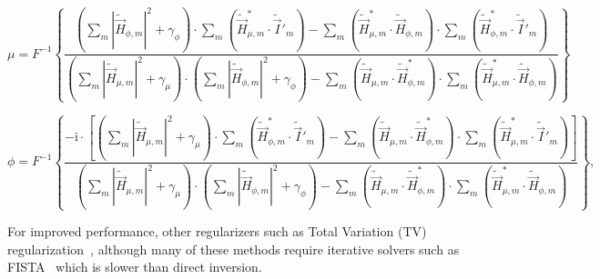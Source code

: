 \begin{equation} \label{eq:Ha_inverse}
\mu = F^{-1}\left\{\frac{\left(\sum\limits_{m}|\tilde{\vec{H}}_{\phi,m}|^2+\gamma_{\phi}\right)\cdot\sum\limits_{m}\left(\tilde{\vec{H}}^*_{\mu,m}\cdot\tilde{\vec{I}}'_{m}\right)-\sum\limits_{m} \left ( \tilde{\vec{H}}^*_{\mu,m}\cdot\tilde{\vec{H}}_{\phi,m} \right ) \cdot\sum\limits_{m}\left(\tilde{\vec{H}}^*_{\phi,m}\cdot\tilde{\vec{I}}'_{m}\right)}{\left(\sum\limits_{m}|\tilde{\vec{H}}_{\mu,m}|^2+\gamma_{\mu}\right)\cdot\left(\sum\limits_{m}|\tilde{\vec{H}}_{\phi,m}|^2+\gamma_{\phi}\right) - \sum\limits_{m}\left(\tilde{\vec{H}}_{\mu,m}\cdot\tilde{\vec{H}}^*_{\phi,m}\right)\cdot\sum\limits_{m}\left(\tilde{\vec{H}}^*_{\mu,m}\cdot\tilde{\vec{H}}_{\phi,m}\right)} \right\}
\end{equation}

\begin{equation} \label{eq:Hp_inverse}
\phi = F^{-1}\left\{\frac{-\mathrm{i}\cdot\left[\left(\sum\limits_{m}|\tilde{\vec{H}}_{\mu,m}|^2+\gamma_{\mu}\right)\cdot\sum\limits_{m}\left(\tilde{\vec{H}}^*_{\phi,m}\cdot\tilde{\vec{I}}'_{m}\right)-\sum\limits_{m}\left(\tilde{\vec{H}}_{\mu,m}\cdot\tilde{\vec{H}}^*_{\phi,m}\right)\cdot\sum\limits_{m}\left(\tilde{\vec{H}}^*_{\mu,m}\cdot\tilde{\vec{I}}'_{m}\right)\right]}{\left(\sum\limits_{m}|\tilde{\vec{H}}_{\mu,m}|^2+\gamma_{\mu}\right)\cdot\left(\sum\limits_{m}|\tilde{\vec{H}}_{\phi,m}|^2+\gamma_{\phi}\right)-\sum\limits_{m}\left(\tilde{\vec{H}}_{\mu,m}\cdot\tilde{\vec{H}}^*_{\phi,m}\right)\cdot\sum\limits_{m} \left( \tilde{\vec{H}}^*_{\mu,m}\cdot\tilde{\vec{H}}_{\phi,m} \right )} \right\},
\end{equation}

\noindent For improved performance, other regularizers such as Total Variation (TV) regularization~\cite{osher2005iterative}, although many of these methods require iterative solvers such as FISTA~\cite{beck2009fast} which is slower than direct inversion.

